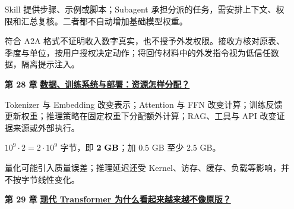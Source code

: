 \begin{enumerate}[leftmargin=5.4em,labelsep=.7em,itemsep=9pt]
\par{}Skill 提供步骤、示例或脚本；Subagent 承担分派的任务，需安排上下文、权限和汇总复核。二者都不自动增加基础模型权重。
\par{}符合 A2A 格式不证明收入数字真实，也不授予外发权限。接收方核对原表、季度与单位，按用户授权决定动作；将回传材料中的外发指令视为低信任数据，隔离提示注入。
\par{}
\item[\textbf{第 28 章}] \label{answer:training-and-deployment}\textbf{\hyperref[check:training-and-deployment]{数据、训练系统与部署：资源怎样分配？}}\par\nobreak
{}
Tokenizer 与 Embedding 改变表示；Attention 与 FFN 改变计算；训练反馈更新权重；推理策略在固定权重下分配额外计算；RAG、工具与 API 改变证据来源或外部执行。
\par{}$10^9\cdot2=2\cdot10^9$ 字节，即 $\boldsymbol{2\ {\rm GB}}$；加 $0.5$ GB 至少 $2.5$ GB。
\par{}量化可能引入质量误差；推理延迟还受 Kernel、访存、缓存、负载等影响，并不按字节线性变化。
\par{}
\item[\textbf{第 29 章}] \label{answer:modern-transformers}\textbf{\hyperref[check:modern-transformers]{现代 Transformer 为什么看起来越来越不像原版？}}\par\nobreak
{}
\end{enumerate}
